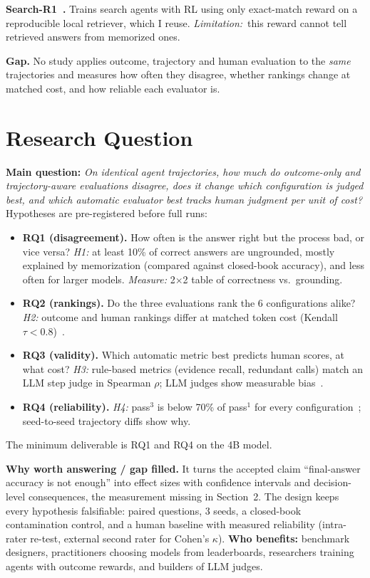 \documentclass[10pt]{article}
\newcommand{\limn}{\textit{Limitation:}~}
\begin{document}
\textbf{Search-R1~\cite{jin2025searchr1}.} Trains search agents with RL using only exact-match reward on a reproducible local retriever, which I reuse. \limn this reward cannot tell retrieved answers from memorized ones.

\textbf{Gap.} No study applies outcome, trajectory and human evaluation to the \emph{same} trajectories and measures how often they disagree, whether rankings change at matched cost, and how reliable each evaluator is.

\section{Research Question}

\textbf{Main question:} \emph{On identical agent trajectories, how much do outcome-only and trajectory-aware evaluations disagree, does it change which configuration is judged best, and which automatic evaluator best tracks human judgment per unit of cost?} Hypotheses are pre-registered before full runs:
\begin{itemize}
  \item \textbf{RQ1 (disagreement).} How often is the answer right but the process bad, or vice versa? \emph{H1:} at least 10\% of correct answers are ungrounded, mostly explained by memorization (compared against closed-book accuracy), and less often for larger models. \emph{Measure:} 2$\times$2 table of correctness vs.\ grounding.
  \item \textbf{RQ2 (rankings).} Do the three evaluations rank the 6 configurations alike? \emph{H2:} outcome and human rankings differ at matched token cost (Kendall $\tau<0.8$)~\cite{kapoor2024agents}.
  \item \textbf{RQ3 (validity).} Which automatic metric best predicts human scores, at what cost? \emph{H3:} rule-based metrics (evidence recall, redundant calls) match an LLM step judge in Spearman $\rho$; LLM judges show measurable bias~\cite{zheng2023judging}.
  \item \textbf{RQ4 (reliability).} \emph{H4:} pass$^3$ is below 70\% of pass$^1$ for every configuration~\cite{yao2024taubench}; seed-to-seed trajectory diffs show why.
\end{itemize}
The minimum deliverable is RQ1 and RQ4 on the 4B model.

\textbf{Why worth answering / gap filled.} It turns the accepted claim ``final-answer accuracy is not enough'' into effect sizes with confidence intervals and decision-level consequences, the measurement missing in Section~2. The design keeps every hypothesis falsifiable: paired questions, 3 seeds, a closed-book contamination control, and a human baseline with measured reliability (intra-rater re-test, external second rater for Cohen's $\kappa$). \textbf{Who benefits:} benchmark designers, practitioners choosing models from leaderboards, researchers training agents with outcome rewards, and builders of LLM judges.
\end{document}

